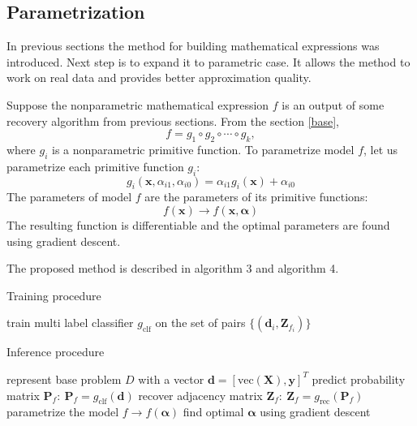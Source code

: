 \documentclass[12pt]{article}
\begin{document}
\subsection{Parametrization}
In previous sections the method for building mathematical expressions was introduced.
Next step is to expand it to parametric case.
It allows the method to work on real data and provides better approximation quality.

Suppose the nonparametric mathematical expression $f$ is an output of some recovery algorithm from previous sections. From the section \ref{base},
\begin{equation}
  f = g_1 \circ g_2 \circ \cdots \circ g_k,
\end{equation}
where $g_i$ is a nonparametric primitive function. To parametrize model $f$, let us parametrize each primitive function $g_i$:
\begin{equation}
  g_i(\mathbf{x}, \alpha_{i1}, \alpha_{i0}) = \alpha_{i1}g_i(\mathbf{x}) + \alpha_{i0}
\end{equation}
The parameters of model $f$ are the parameters of its primitive functions:
\begin{equation}
  f(\mathbf{x}) \rightarrow f(\mathbf{x}, \bm{\alpha})
\end{equation}
The resulting function is differentiable and the optimal parameters are found using gradient descent.

The proposed method is described in algorithm 3 and algorithm 4.

\begin{algorithm}[!ht]
\caption{Training procedure}
  train multi label classifier $g_\text{clf}$ on the set of pairs $\{(\mathbf{d}_i, \mathbf{Z}_{f_i})\}$\;
\end{algorithm}

\begin{algorithm}[!ht]
\caption{Inference procedure}
  represent base problem $D$ with a vector $\mathbf{d} = [\text{vec}(\mathbf{X}), \mathbf{y}]^T$\;
  predict probability matrix $\mathbf{P}_f: \ \mathbf{P}_f = g_\text{clf}(\mathbf{d})$\;
  recover adjacency matrix $\mathbf{Z}_f: \ \mathbf{Z}_f = g_\text{rec}(\mathbf{P}_f)$\;
  parametrize the model $f \rightarrow f(\bm{\alpha})$\;
  find optimal $\bm{\alpha}$ using gradient descent\;
\end{algorithm}
\end{document}
